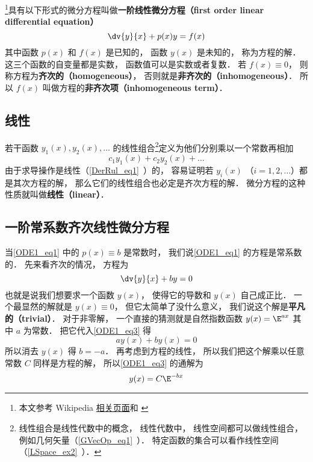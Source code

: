 
\begin{issues}
\issueNeedCite
{}
\end{issues}


\footnote{本文参考 Wikipedia \href{https://en.wikipedia.org/wiki/Ordinary_differential_equation}{相关页面}和 \cite{同济高}}具有以下形式的微分方程叫做\textbf{一阶线性微分方程（first order linear differential equation）}
\begin{equation}\label{ODE1_eq1}
\dv{y}{x} + p(x)y = f(x)
\end{equation}
其中函数 $p(x)$ 和 $f(x)$ 是已知的， 函数 $y(x)$ 是未知的， 称为方程的解． 这三个函数的自变量都是实数， 函数值可以是实数或者复数． 若 $f(x) \equiv 0$， 则称方程为\textbf{齐次的（homogeneous）}， 否则就是\textbf{非齐次的（inhomogeneous）}． 所以 $f(x)$ 叫做方程的\textbf{非齐次项（inhomogeneous term）}．

\subsection{线性}
若干函数 $y_1(x), y_2(x), \dots$ 的线性组合\footnote{线性组合是线性代数中的概念， 线性代数中， 线性空间都可以做线性组合， 例如几何矢量（\autoref{GVecOp_eq1}~）． 特定函数的集合可以看作线性空间（\autoref{LSpace_ex2}~）．}定义为他们分别乘以一个常数再相加
\begin{equation}
c_1 y_1(x) + c_2 y_2(x) + \dots
\end{equation}
由于求导操作是线性（\autoref{DerRul_eq1}~）的， 容易证明若 $y_i(x)$ （$i = 1, 2,\dots$）都是其次方程的解， 那么它们的线性组合也必定是齐次方程的解． 微分方程的这种性质就叫做\textbf{线性（linear）}．

\subsection{一阶常系数齐次线性微分方程}
当\autoref{ODE1_eq1} 中的 $p(x) \equiv b$ 是常数时， 我们说\autoref{ODE1_eq1} 的方程是常系数的． 先来看齐次的情况， 方程为
\begin{equation}\label{ODE1_eq3}
\dv{y}{x} + by = 0
\end{equation}
也就是说我们想要求一个函数 $y(x)$， 使得它的导数和 $y(x)$ 自己成正比． 一个最显然的解就是 $y(x) \equiv 0$， 但它太简单了没什么意义， 我们说这个解是\textbf{平凡的（trivial）}． 对于非零解， 一个直接的猜测就是自然指数函数 $y(x) = \E^{ax}$ 其中 $a$ 为常数． 把它代入\autoref{ODE1_eq3} 得
\begin{equation}
ay(x) + by(x) = 0
\end{equation}
所以消去 $y(x)$ 得 $b = -a$． 再考虑到方程的线性， 所以我们把这个解乘以任意常数 $C$ 同样是方程的解， 所以\autoref{ODE1_eq3} 的通解为
\begin{equation}
y(x) = C\E^{-bx}
\end{equation}

